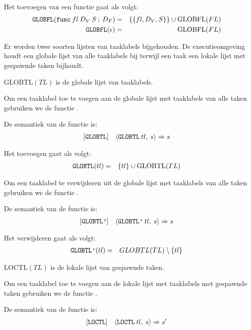 Het toevoegen van een functie gaat als volgt:
\begin{eqnarray*}
	\textnormal{\texttt{GLOBFL}}(\textnormal{\texttt{func}}\:fl\:D_V\:S \:;\:D_F) &=& \{\{fl,D_V,S\}\}\cup\mathrm{GLOBFL}(FL) \\
	\textnormal{\texttt{GLOBFL}}(\epsilon) &=& \mathrm{GLOBFL}(FL)
\end{eqnarray*}


Er worden twee soorten lijsten van taaklabels bijgehouden. De executieomgeving houdt een globale lijst van alle
taaklabels bij terwijl een taak een lokale lijst met gespawnde taken bijhoudt.

\(\mathrm{GLOBTL}(TL)\) is de globale lijst van taaklabels.

Om een taaklabel toe te voegen aan de globale lijst met taaklabels van alle taken gebruiken we de functie .

De semantiek van de functie is:
\begin{eqnarray*}
\left[\textnormal{\texttt{GLOBTL}}\right]&&
\langle\textnormal{\texttt{GLOBTL}}\:tl,\:s\rangle => s\\
\end{eqnarray*}

Het toevoegen gaat als volgt:
\begin{eqnarray*}
	\textnormal{\texttt{GLOBTL}}(tl) &=& \{tl\}\cup\mathrm{GLOBTL}(TL) \\
\end{eqnarray*}

Om een taaklabel te verwijderen uit de globale lijst met taaklabels van alle taken gebruiken we de functie
.

De semantiek van de functie is:
\begin{eqnarray*}
\left[\textnormal{\texttt{GLOBTL'}}\right]&&
\langle\textnormal{\texttt{GLOBTL'}}\:tl,\:s\rangle => s\\
\end{eqnarray*}

Het verwijderen gaat als volgt:
\begin{eqnarray*}
	\textnormal{\texttt{GLOBTL'}}(tl) &=& {GLOBTL}(TL) \setminus \{tl\} \\
\end{eqnarray*}

\(\mathrm{LOCTL}(TL)\) is de lokale lijst van gespawnde taken.

Om een taaklabel toe te voegen aan de lokale lijst met taaklabels met gespawnde taken gebruiken we de functie
.

De semantiek van de functie is:
\begin{eqnarray*}
\left[\textnormal{\texttt{LOCTL}}\right]&&
\langle\textnormal{\texttt{LOCTL}}\:tl,\:s\rangle => s'\\
\end{eqnarray*}

